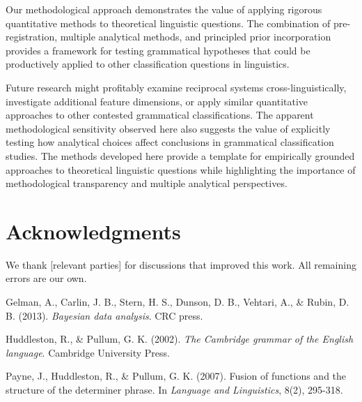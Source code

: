 \documentclass[12pt]{article}
\begin{document}
Our methodological approach demonstrates the value of applying rigorous quantitative methods to theoretical linguistic questions. The combination of pre-registration, multiple analytical methods, and principled prior incorporation provides a framework for testing grammatical hypotheses that could be productively applied to other classification questions in linguistics.

Future research might profitably examine reciprocal systems cross-linguistically, investigate additional feature dimensions, or apply similar quantitative approaches to other contested grammatical classifications. The apparent methodological sensitivity observed here also suggests the value of explicitly testing how analytical choices affect conclusions in grammatical classification studies. The methods developed here provide a template for empirically grounded approaches to theoretical linguistic questions while highlighting the importance of methodological transparency and multiple analytical perspectives.

\section*{Acknowledgments}

We thank [relevant parties] for discussions that improved this work. All remaining errors are our own.


\begin{thebibliography}{9}

Gelman, A., Carlin, J. B., Stern, H. S., Dunson, D. B., Vehtari, A., \& Rubin, D. B. (2013). 
\textit{Bayesian data analysis}. CRC press.

Huddleston, R., \& Pullum, G. K. (2002). 
\textit{The Cambridge grammar of the English language}. 
Cambridge University Press.

Payne, J., Huddleston, R., \& Pullum, G. K. (2007). 
Fusion of functions and the structure of the determiner phrase. 
In \textit{Language and Linguistics}, 8(2), 295-318.

\end{thebibliography}
\end{document}

